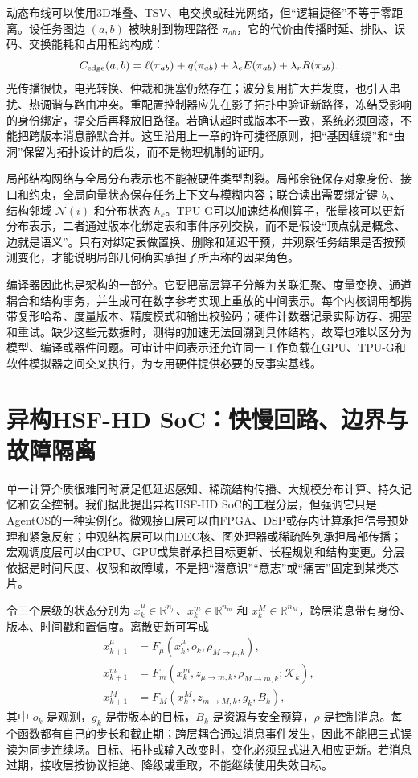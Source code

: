 动态布线可以使用3D堆叠、TSV、电交换或硅光网络，但“逻辑捷径”不等于零距离。设任务图边 $(a,b)$ 被映射到物理路径 $\pi_{ab}$，它的代价由传播时延、排队、误码、交换能耗和占用租约构成：
\[
C_{\rm edge}(a,b)=
\ell(\pi_{ab})+q(\pi_{ab})+\lambda_eE(\pi_{ab})
+\lambda_rR(\pi_{ab}).
\]
光传播很快，电光转换、仲裁和拥塞仍然存在；波分复用扩大并发度，也引入串扰、热调谐与路由冲突。重配置控制器应先在影子拓扑中验证新路径，冻结受影响的身份绑定，提交后再释放旧路径。若确认超时或版本不一致，系统必须回滚，不能把跨版本消息静默合并。这里沿用上一章的许可捷径原则，把“基因缠绕”和“虫洞”保留为拓扑设计的启发，而不是物理机制的证明。

局部结构网络与全局分布表示也不能被硬件类型割裂。局部余链保存对象身份、接口和约束，全局向量状态保存任务上下文与模糊内容；联合读出需要绑定键 $b_i$、结构邻域 $\mathcal N(i)$ 和分布状态 $h_k$。TPU-G可以加速结构侧算子，张量核可以更新分布表示，二者通过版本化绑定表和事件序列交换，而不是假设“顶点就是概念、边就是语义”。只有对绑定表做置换、删除和延迟干预，并观察任务结果是否按预测变化，才能说明局部几何确实承担了所声称的因果角色。

编译器因此也是架构的一部分。它要把高层算子分解为关联汇聚、度量变换、通道耦合和结构事务，并生成可在数字参考实现上重放的中间表示。每个内核调用都携带复形哈希、度量版本、精度模式和输出校验码；硬件计数器记录实际访存、拥塞和重试。缺少这些元数据时，测得的加速无法回溯到具体结构，故障也难以区分为模型、编译或器件问题。可审计中间表示还允许同一工作负载在GPU、TPU-G和软件模拟器之间交叉执行，为专用硬件提供必要的反事实基线。

\section{异构HSF-HD SoC：快慢回路、边界与故障隔离}
\label{sec:section_4900}

单一计算介质很难同时满足低延迟感知、稀疏结构传播、大规模分布计算、持久记忆和安全控制。我们据此提出异构HSF-HD SoC的工程分层，但强调它只是AgentOS的一种实例化。微观接口层可以由FPGA、DSP或存内计算承担信号预处理和紧急反射；中观结构层可以由DEC核、图处理器或稀疏阵列承担局部传播；宏观调度层可以由CPU、GPU或集群承担目标更新、长程规划和结构变更。分层依据是时间尺度、权限和故障域，不是把“潜意识”“意志”或“痛苦”固定到某类芯片。

令三个层级的状态分别为 $x_k^\mu\in\mathbb R^{n_\mu}$、$x_k^m\in\mathbb R^{n_m}$ 和 $x_k^M\in\mathbb R^{n_M}$，跨层消息带有身份、版本、时间戳和置信度。离散更新可写成
\[
\begin{aligned}
x_{k+1}^\mu&=F_\mu(x_k^\mu,o_k,\rho_{M\to\mu,k}),\\
x_{k+1}^m&=F_m(x_k^m,z_{\mu\to m,k},\rho_{M\to m,k};\mathcal K_k),\\
x_{k+1}^M&=F_M(x_k^M,z_{m\to M,k},g_k,B_k),
\end{aligned}
\]
其中 $o_k$ 是观测，$g_k$ 是带版本的目标，$B_k$ 是资源与安全预算，$\rho$ 是控制消息。每个函数都有自己的步长和截止期；跨层耦合通过消息事件发生，因此不能把三式误读为同步连续场。目标、拓扑或输入改变时，变化必须显式进入相应更新。若消息过期，接收层按协议拒绝、降级或重取，不能继续使用失效目标。

